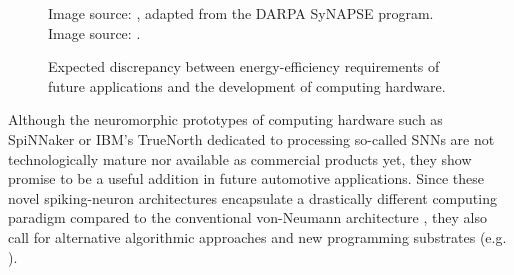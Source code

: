 \begin{figure}[h!]
    \centering
    \caption{Expected discrepancy between energy-efficiency requirements of future applications and the development of computing hardware. ~\protect{}} Image source: \cite{Farahini2016}, adapted from the \acs{DARPA} \acs{SyNAPSE} program. ~\protect{} Image source: \cite{Marr2013}.
    \label{fig:energy_efficiency_issues}
\end{figure}
Although the neuromorphic prototypes of computing hardware such as \ac{SpiNNaker} \cite{Furber2014} or  IBM's TrueNorth \cite{Akopyan2015} dedicated to processing so-called \acp{SNN} are not technologically mature nor available as commercial products yet, they show promise to be a useful addition in future automotive applications.
Since these novel spiking-neuron architectures encapsulate a drastically different computing paradigm compared to the conventional von-Neumann architecture \cite{vonNeumann1993}, they also call for alternative algorithmic approaches and new programming substrates (e.g. \cite{Amir2013}).

